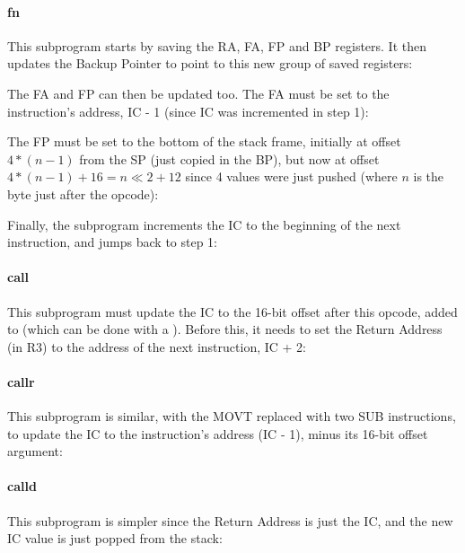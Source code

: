 \paragraph{fn} This subprogram starts by saving the RA, FA, FP and BP
registers. It then updates the Backup Pointer to point to this new group of
saved registers:


\noindent The FA and FP can then be updated too. The FA must be set to the
 instruction's address, IC - 1 (since IC was incremented in step 1):


\noindent The FP must be set to the bottom of the stack frame, initially at
offset $4*(n-1)$ from the SP (just copied in the BP), but now at offset
$4*(n-1)+16=n \ll 2 + 12$ since 4 values were just pushed (where $n$ is the
byte just after the  opcode):


\noindent Finally, the  subprogram increments the IC to the
beginning of the next instruction, and jumps back to step 1:


\paragraph{call} This subprogram must update the IC to the 16-bit offset after
this opcode, added to  (which can be done with a ).
Before this, it needs to set the Return Address (in R3) to the address of the
next instruction, IC + 2:


\paragraph{callr} This subprogram is similar, with the MOVT replaced with two
SUB instructions, to update the IC to the instruction's address (IC - 1), minus
its 16-bit offset argument:


\paragraph{calld} This subprogram is simpler since the Return Address is just
the IC, and the new IC value is just popped from the stack:

